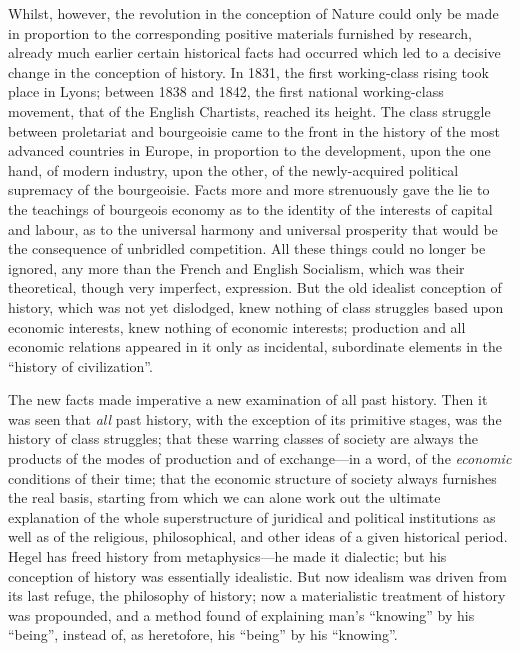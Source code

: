 Whilst, however, the revolution in the conception of Nature could only be made
in proportion to the corresponding positive materials furnished by research,
already much earlier certain historical facts had occurred which led to a
decisive change in the conception of history. In 1831, the first working-class
rising took place in Lyons; between 1838 and 1842, the first national
working-class movement, that of the English Chartists, reached its height. The
class struggle between proletariat and bourgeoisie came to the front in the
history of the most advanced countries in Europe, in proportion to the
development, upon the one hand, of modern industry, upon the other, of the
newly-acquired political supremacy of the bourgeoisie. Facts more and more
strenuously gave the lie to the teachings of bourgeois economy as to the
identity of the interests of capital and labour, as to the universal harmony and
universal prosperity that would be the consequence of unbridled competition. All
these things could no longer be ignored, any more than the French and English
Socialism, which was their theoretical, though very imperfect, expression. But
the old idealist conception of history, which was not yet dislodged, knew
nothing of class struggles based upon economic interests, knew nothing of
economic interests; production and all economic relations appeared in it only as
incidental, subordinate elements in the ``history of civilization''.

The new facts made imperative a new examination of all past history. Then it was
seen that \emph{all} past history, with the exception of its primitive stages,
was the history of class struggles; that these warring classes of society are
always the products of the modes of production and of exchange---in a word, of
the \emph{economic} conditions of their time; that the economic structure of
society always furnishes the real basis, starting from which we can alone work
out the ultimate explanation of the whole superstructure of juridical and
political institutions as well as of the religious, philosophical, and other
ideas of a given historical period. Hegel has freed history from
metaphysics---he made it dialectic; but his conception of history was
essentially idealistic. But now idealism was driven from its last refuge, the
philosophy of history; now a materialistic treatment of history was propounded,
and a method found of explaining man's ``knowing'' by his ``being'', instead of,
as heretofore, his ``being'' by his ``knowing''.


